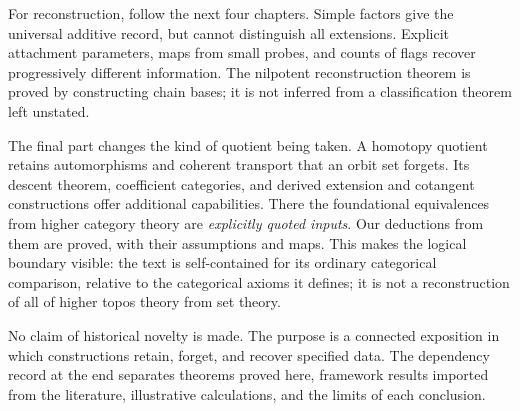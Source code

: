 For reconstruction, follow the next four chapters. Simple factors give
the universal additive record, but cannot distinguish all extensions.
Explicit attachment parameters, maps from small probes, and counts of
flags recover progressively different information. The nilpotent
reconstruction theorem is proved by constructing chain bases; it is not
inferred from a classification theorem left unstated.

The final part changes the kind of quotient being taken. A homotopy
quotient retains automorphisms and coherent transport that an orbit set
forgets. Its descent theorem, coefficient categories, and derived
extension and cotangent constructions offer additional capabilities.
There the foundational equivalences from higher category theory are
\emph{explicitly quoted inputs}. Our deductions from them are proved,
with their assumptions and maps. This makes the logical boundary visible:
the text is self-contained for its ordinary categorical comparison,
relative to the categorical axioms it defines; it is not a reconstruction
of all of higher topos theory from set theory.

No claim of historical novelty is made. The purpose is a connected
exposition in which constructions retain, forget, and recover specified
data. The dependency record at the end separates theorems proved here,
framework results imported from the literature, illustrative calculations,
and the limits of each conclusion.

